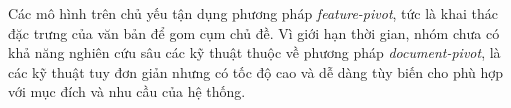 Các mô hình trên chủ yếu tận dụng phương pháp \textit{feature-pivot}, tức là khai thác đặc trưng của văn bản để gom cụm chủ đề. Vì giới hạn thời gian, nhóm chưa có khả năng nghiên cứu sâu các kỹ thuật thuộc về phương pháp \textit{document-pivot}, là các kỹ thuật tuy đơn giản nhưng có tốc độ cao và dễ dàng tùy biến cho phù hợp với mục đích và nhu cầu của hệ thống.
